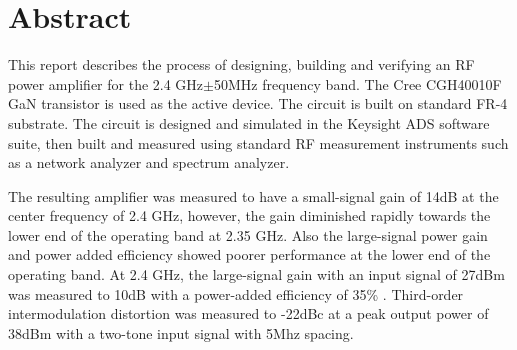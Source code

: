 \chapter*{Abstract}
This report describes the process of designing, building and verifying an RF power amplifier for the 2.4 GHz$\pm$50MHz frequency band. The Cree CGH40010F GaN transistor is used as the active device. The circuit is built on standard FR-4 substrate. The circuit is designed and simulated in the Keysight ADS software suite, then built and measured using standard RF measurement instruments such as a network analyzer and spectrum analyzer.

The resulting amplifier was measured to have a small-signal gain of 14dB at the center frequency of 2.4 GHz, however, the gain diminished rapidly towards the lower end of the operating band at 2.35 GHz. Also the large-signal power gain and power added efficiency showed poorer performance at the lower end of the operating band. At 2.4 GHz, the large-signal gain with an input signal of 27dBm was measured to 10dB with a power-added efficiency of 35\% . Third-order intermodulation distortion was measured to -22dBc at a peak output power of 38dBm with a two-tone input signal with 5Mhz spacing.

